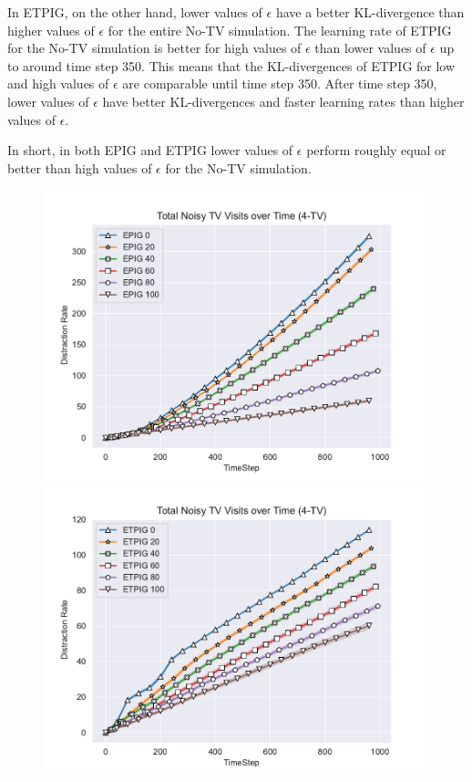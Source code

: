 \documentclass[12pt]{thesis}
\begin{document}
In ETPIG, on the other hand, lower values of $\epsilon$ have a better KL-divergence than higher values of $\epsilon$ for the entire No-TV simulation. The learning rate of ETPIG for the No-TV simulation is better for high values of $\epsilon$ than lower values of $\epsilon$ up to around time step 350. This means that the KL-divergences of ETPIG for low and high values of $\epsilon$ are comparable until time step 350. After time step 350, lower values of $\epsilon$ have better KL-divergences and faster learning rates than higher values of $\epsilon$.

In short, in both EPIG and ETPIG lower values of $\epsilon$ perform roughly equal or better than high values of $\epsilon$ for the No-TV simulation.

\begin{figure}[p]
	\includegraphics[scale=0.5]{"images/Epsilon_Distractions_EPIG_4-TV.pdf"}
	\includegraphics[scale=0.5]{"images/Epsilon_Distractions_ETPIG_4-TV.pdf"}
	

\end{figure}
\end{document}
